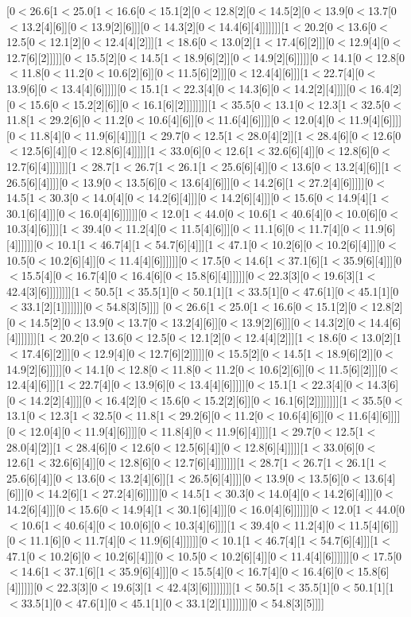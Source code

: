 [0$<$26.6[1$<$25.0[1$<$16.6[0$<$15.1[2][0$<$12.8[2][0$<$14.5[2][0$<$13.9[0$<$13.7[0$<$13.2[4][6]][0$<$13.9[2][6]]][0$<$14.3[2][0$<$14.4[6][4]]]]]]][1$<$20.2[0$<$13.6[0$<$12.5[0$<$12.1[2][0$<$12.4[4][2]]][1$<$18.6[0$<$13.0[2][1$<$17.4[6][2]]][0$<$12.9[4][0$<$12.7[6][2]]]]][0$<$15.5[2][0$<$14.5[1$<$18.9[6][2]][0$<$14.9[2][6]]]]][0$<$14.1[0$<$12.8[0$<$11.8[0$<$11.2[0$<$10.6[2][6]][0$<$11.5[6][2]]][0$<$12.4[4][6]]][1$<$22.7[4][0$<$13.9[6][0$<$13.4[4][6]]]]][0$<$15.1[1$<$22.3[4][0$<$14.3[6][0$<$14.2[2][4]]]][0$<$16.4[2][0$<$15.6[0$<$15.2[2][6]][0$<$16.1[6][2]]]]]]]][1$<$35.5[0$<$13.1[0$<$12.3[1$<$32.5[0$<$11.8[1$<$29.2[6][0$<$11.2[0$<$10.6[4][6]][0$<$11.6[4][6]]]][0$<$12.0[4][0$<$11.9[4][6]]]][0$<$11.8[4][0$<$11.9[6][4]]]][1$<$29.7[0$<$12.5[1$<$28.0[4][2]][1$<$28.4[6][0$<$12.6[0$<$12.5[6][4]][0$<$12.8[6][4]]]]][1$<$33.0[6][0$<$12.6[1$<$32.6[6][4]][0$<$12.8[6][0$<$12.7[6][4]]]]]]][1$<$28.7[1$<$26.7[1$<$26.1[1$<$25.6[6][4]][0$<$13.6[0$<$13.2[4][6]][1$<$26.5[6][4]]]][0$<$13.9[0$<$13.5[6][0$<$13.6[4][6]]][0$<$14.2[6][1$<$27.2[4][6]]]]][0$<$14.5[1$<$30.3[0$<$14.0[4][0$<$14.2[6][4]]][0$<$14.2[6][4]]][0$<$15.6[0$<$14.9[4][1$<$30.1[6][4]]][0$<$16.0[4][6]]]]]][0$<$12.0[1$<$44.0[0$<$10.6[1$<$40.6[4][0$<$10.0[6][0$<$10.3[4][6]]]][1$<$39.4[0$<$11.2[4][0$<$11.5[4][6]]][0$<$11.1[6][0$<$11.7[4][0$<$11.9[6][4]]]]]][0$<$10.1[1$<$46.7[4][1$<$54.7[6][4]]][1$<$47.1[0$<$10.2[6][0$<$10.2[6][4]]][0$<$10.5[0$<$10.2[6][4]][0$<$11.4[4][6]]]]]][0$<$17.5[0$<$14.6[1$<$37.1[6][1$<$35.9[6][4]]][0$<$15.5[4][0$<$16.7[4][0$<$16.4[6][0$<$15.8[6][4]]]]]][0$<$22.3[3][0$<$19.6[3][1$<$42.4[3][6]]]]]]]][1$<$50.5[1$<$35.5[1][0$<$50.1[1][1$<$33.5[1][0$<$47.6[1][0$<$45.1[1][0$<$33.1[2][1]]]]]]][0$<$54.8[3][5]]]]
[0$<$26.6[1$<$25.0[1$<$16.6[0$<$15.1[2][0$<$12.8[2][0$<$14.5[2][0$<$13.9[0$<$13.7[0$<$13.2[4][6]][0$<$13.9[2][6]]][0$<$14.3[2][0$<$14.4[6][4]]]]]]][1$<$20.2[0$<$13.6[0$<$12.5[0$<$12.1[2][0$<$12.4[4][2]]][1$<$18.6[0$<$13.0[2][1$<$17.4[6][2]]][0$<$12.9[4][0$<$12.7[6][2]]]]][0$<$15.5[2][0$<$14.5[1$<$18.9[6][2]][0$<$14.9[2][6]]]]][0$<$14.1[0$<$12.8[0$<$11.8[0$<$11.2[0$<$10.6[2][6]][0$<$11.5[6][2]]][0$<$12.4[4][6]]][1$<$22.7[4][0$<$13.9[6][0$<$13.4[4][6]]]]][0$<$15.1[1$<$22.3[4][0$<$14.3[6][0$<$14.2[2][4]]]][0$<$16.4[2][0$<$15.6[0$<$15.2[2][6]][0$<$16.1[6][2]]]]]]]][1$<$35.5[0$<$13.1[0$<$12.3[1$<$32.5[0$<$11.8[1$<$29.2[6][0$<$11.2[0$<$10.6[4][6]][0$<$11.6[4][6]]]][0$<$12.0[4][0$<$11.9[4][6]]]][0$<$11.8[4][0$<$11.9[6][4]]]][1$<$29.7[0$<$12.5[1$<$28.0[4][2]][1$<$28.4[6][0$<$12.6[0$<$12.5[6][4]][0$<$12.8[6][4]]]]][1$<$33.0[6][0$<$12.6[1$<$32.6[6][4]][0$<$12.8[6][0$<$12.7[6][4]]]]]]][1$<$28.7[1$<$26.7[1$<$26.1[1$<$25.6[6][4]][0$<$13.6[0$<$13.2[4][6]][1$<$26.5[6][4]]]][0$<$13.9[0$<$13.5[6][0$<$13.6[4][6]]][0$<$14.2[6][1$<$27.2[4][6]]]]][0$<$14.5[1$<$30.3[0$<$14.0[4][0$<$14.2[6][4]]][0$<$14.2[6][4]]][0$<$15.6[0$<$14.9[4][1$<$30.1[6][4]]][0$<$16.0[4][6]]]]]][0$<$12.0[1$<$44.0[0$<$10.6[1$<$40.6[4][0$<$10.0[6][0$<$10.3[4][6]]]][1$<$39.4[0$<$11.2[4][0$<$11.5[4][6]]][0$<$11.1[6][0$<$11.7[4][0$<$11.9[6][4]]]]]][0$<$10.1[1$<$46.7[4][1$<$54.7[6][4]]][1$<$47.1[0$<$10.2[6][0$<$10.2[6][4]]][0$<$10.5[0$<$10.2[6][4]][0$<$11.4[4][6]]]]]][0$<$17.5[0$<$14.6[1$<$37.1[6][1$<$35.9[6][4]]][0$<$15.5[4][0$<$16.7[4][0$<$16.4[6][0$<$15.8[6][4]]]]]][0$<$22.3[3][0$<$19.6[3][1$<$42.4[3][6]]]]]]]][1$<$50.5[1$<$35.5[1][0$<$50.1[1][1$<$33.5[1][0$<$47.6[1][0$<$45.1[1][0$<$33.1[2][1]]]]]]][0$<$54.8[3][5]]]]
